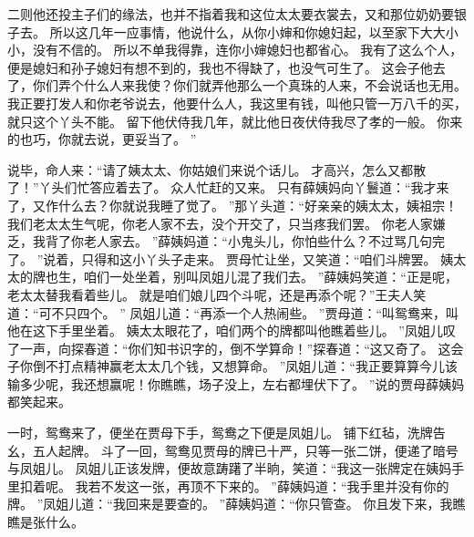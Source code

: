 二则他还投主子们的缘法，也并不指着我和这位太太要衣裳去，又和那位奶奶要银子去。
所以这几年一应事情，他说什么，从你小婶和你媳妇起，以至家下大大小小，没有不信的。
所以不单我得靠，连你小婶媳妇也都省心。
我有了这么个人，便是媳妇和孙子媳妇有想不到的，我也不得缺了，也没气可生了。
这会子他去了，你们弄个什么人来我使？你们就弄他那么一个真珠的人来，不会说话也无用。
我正要打发人和你老爷说去，他要什么人，我这里有钱，叫他只管一万八千的买，就只这个丫头不能。
留下他伏侍我几年，就比他日夜伏侍我尽了孝的一般。
你来的也巧，你就去说，更妥当了。
”\par
说毕，命人来：“请了姨太太、你姑娘们来说个话儿。
才高兴，怎么又都散了！”丫头们忙答应着去了。
众人忙赶的又来。
只有薛姨妈向丫鬟道：“我才来了，又作什么去？你就说我睡了觉了。
”那丫头道：“好亲亲的姨太太，姨祖宗！我们老太太生气呢，你老人家不去，没个开交了，只当疼我们罢。
你老人家嫌乏，我背了你老人家去。
”薛姨妈道：“小鬼头儿，你怕些什么？不过骂几句完了。
”说着，只得和这小丫头子走来。
贾母忙让坐，又笑道：“咱们斗牌罢。
姨太太的牌也生，咱们一处坐着，别叫凤姐儿混了我们去。
”薛姨妈笑道：“正是呢，老太太替我看着些儿。
就是咱们娘儿四个斗呢，还是再添个呢？”王夫人笑道：“可不只四个。
”
凤姐儿道：“再添一个人热闹些。
”贾母道：“叫鸳鸯来，叫他在这下手里坐着。
姨太太眼花了，咱们两个的牌都叫他瞧着些儿。
”凤姐儿叹了一声，向探春道：“你们知书识字的，倒不学算命！”探春道：“这又奇了。
这会子你倒不打点精神赢老太太几个钱，又想算命。
”凤姐儿道：“我正要算算今儿该输多少呢，我还想赢呢！你瞧瞧，场子没上，左右都埋伏下了。
”说的贾母薛姨妈都笑起来。
\par
一时，鸳鸯来了，便坐在贾母下手，鸳鸯之下便是凤姐儿。
铺下红毡，洗牌告幺，五人起牌。
斗了一回，鸳鸯见贾母的牌已十严，只等一张二饼，便递了暗号与凤姐儿。
凤姐儿正该发牌，便故意踌躇了半晌，笑道：“我这一张牌定在姨妈手里扣着呢。
我若不发这一张，再顶不下来的。
”薛姨妈道：“我手里并没有你的牌。
”凤姐儿道：“我回来是要查的。
”薛姨妈道：“你只管查。
你且发下来，我瞧瞧是张什么。
